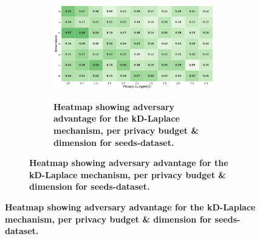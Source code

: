 \begin{figure}[H]
      \centering
      \begin{subfigure}[b]{0.9\textwidth}
            \begin{subfigure}[c]{1\textwidth}
                  \caption{\textbf{Heatmap showing adversary advantage for the kD-Laplace mechanism, per privacy budget \& dimension for seeds-dataset.}}
                  \includegraphics[width=1\textwidth]{Results/kd-laplace/kd-Laplace/seeds-dataset/shokri_mi_adv.png}
                  \label{fig:privacy_seeds-dataset_adversial_advantage_kd-laplace}
            \end{subfigure}
            \vfill %


\end{subfigure}
\end{figure}

